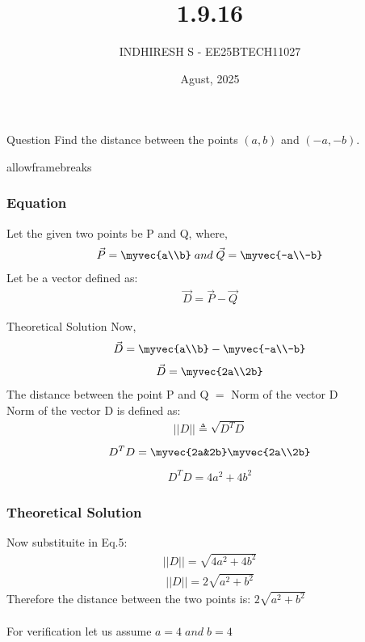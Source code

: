 \documentclass{beamer}
\title %
{1.9.16}
\date{Agust, 2025}
\author %
{INDHIRESH S - EE25BTECH11027}
\begin{document}
\frame{\titlepage}
\begin{frame}{Question}
Find the distance between the points $(a, b)$ and $(-a, -b)$.
\end{frame}
\begin{frame}{allowframebreaks}
\frametitle{Equation}

    \centering
    
    \label{tab:parameters}
  Let the given two points be P and Q, where,
\begin{align}
    \Vec{P}=\myvec{a\\b} \; and\; \Vec{Q}=\myvec{-a\\-b}
\end{align}
	Let  be a vector defined as:
\begin{align}
	\Vec{D}=\Vec{P}-\Vec{Q}   
\end{align}
   
\end{frame}


\begin{frame}{Theoretical Solution}
Now,
\begin{align}
	\Vec{D}=\myvec{a\\b}-\myvec{-a\\-b}
\end{align}
\begin{align}
	\Vec{D}=\myvec{2a\\2b}
\end{align}
	The distance between the point P and Q $=$ Norm of the vector D\\
	Norm of the vector D is defined as:
\begin{align}
    ||D||\triangleq\sqrt{D^TD}
\end{align}
\begin{align}
    D^TD=\myvec{2a&2b}\myvec{2a\\2b}
\end{align}
\begin{align}
    D^TD=4a^2+4b^2
\end{align}

\end{frame}
\begin{frame}
\frametitle{Theoretical Solution}
Now substituite in Eq.5:
\begin{align}
    ||D||=\sqrt{4a^2+4b^2}
\end{align}
\begin{align}
    ||D||=2\sqrt{a^2+b^2}
\end{align}
Therefore the distance between the two points is:    $2\sqrt{a^2+b^2}$\\\\
For verification let us assume $a=4\;and\; b=4$\\

\end{frame}
\end{document}
